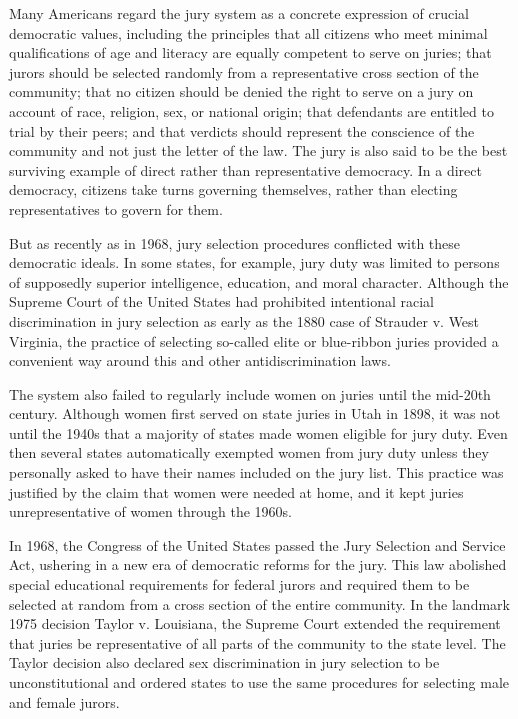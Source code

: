Many Americans regard the jury system as a concrete expression of crucial democratic values, including the principles that all citizens who meet minimal qualifications of age and literacy are equally competent to serve on juries; that jurors should be selected randomly from a representative cross section of the community; that no citizen should be denied the right to serve on a jury on account of race, religion, sex, or national origin; that defendants are entitled to trial by their peers; and that verdicts should represent the conscience of the community and not just the letter of the law. The jury is also said to be the best surviving example of direct rather than representative democracy. In a direct democracy, citizens take turns governing themselves, rather than electing representatives to govern for them.


But as recently as in 1968, jury selection procedures conflicted with these democratic ideals. In some states, for example, jury duty was limited to persons of supposedly superior intelligence, education, and moral character. Although the Supreme Court of the United States had prohibited intentional racial discrimination in jury selection as early as the 1880 case of Strauder v. West Virginia, the practice of selecting so-called elite or blue-ribbon juries provided a convenient way around this and other antidiscrimination laws.


The system also failed to regularly include women on juries until the mid-20th century. Although women first served on state juries in Utah in 1898, it was not until the 1940s that a majority of states made women eligible for jury duty. Even then several states automatically exempted women from jury duty unless they personally asked to have their names included on the jury list. This practice was justified by the claim that women were needed at home, and it kept juries unrepresentative of women through the 1960s.


In 1968, the Congress of the United States passed the Jury Selection and Service Act, ushering in a new era of democratic reforms for the jury. This law abolished special educational requirements for federal jurors and required them to be selected at random from a cross section of the entire community. In the landmark 1975 decision Taylor v. Louisiana, the Supreme Court extended the requirement that juries be representative of all parts of the community to the state level. The Taylor decision also declared sex discrimination in jury selection to be unconstitutional and ordered states to use the same procedures for selecting male and female jurors.